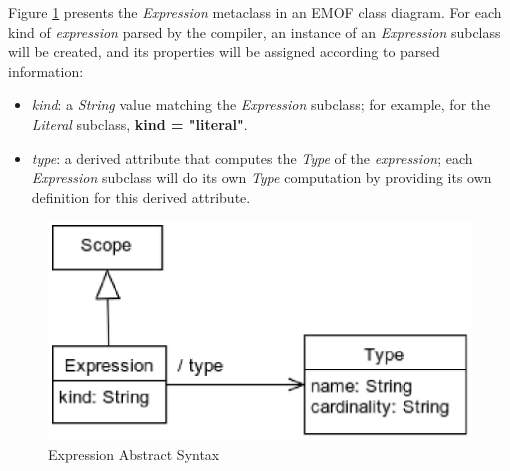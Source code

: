 Figure \ref{fig:meta:expression} presents the \emph{Expression} metaclass
in an EMOF \cite{mof} class diagram.
For each kind of \emph{expression} parsed by the compiler,
an instance of an \emph{Expression} subclass will be created,
and its properties will be assigned
according to parsed information:

\begin{itemize}

\item \emph{kind}:
a \emph{String} value matching the \emph{Expression} subclass;
for example, for the \emph{Literal} subclass, \textbf{kind = "literal"}.

\item \emph{type}:
a derived attribute that computes the \emph{Type} of the \emph{expression};
each \emph{Expression} subclass will do its own \emph{Type} computation
by providing its own definition for this derived attribute.

\end{itemize}

\begin{figure}[H]
\includegraphics[width=\textwidth]{metamodel/expression}
\caption{Expression Abstract Syntax}
\label{fig:meta:expression}
\end{figure}
